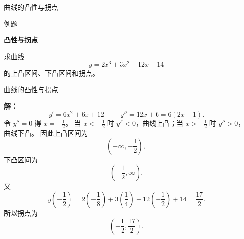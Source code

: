 \documentclass[aspectratio=169,10pt,fontset=fandol]{ctexbeamer}
\begin{document}
\begin{frame}[t,fragile]{曲线的凸性与拐点}
\footnotesize
\begin{block}{例题}
{\footnotesize
\textbf{凸性与拐点}\par

求曲线
\[
y=2x^3+3x^2+12x+14
\]
的上凸区间、下凸区间和拐点。

}
\end{block}
\end{frame}
\begin{frame}[t,fragile]{曲线的凸性与拐点}
\footnotesize
{\footnotesize
\textbf{解：}
\[
y'=6x^2+6x+12,\qquad y''=12x+6=6(2x+1).
\]
令 $y''=0$ 得 $x=-\frac12$。 当 $x<-\frac12$ 时 $y''<0$，曲线上凸；当 $x>-\frac12$ 时 $y''>0$，曲线下凸。 因此上凸区间为
\[
\left(-\infty,-\frac12\right),
\]
下凸区间为
\[
\left(-\frac12,\infty\right).
\]
又
\[
y\left(-\frac12\right)=2\left(-\frac18\right)+3\left(\frac14\right)+12\left(-\frac12\right)+14
=\frac{17}{2}.
\]
所以拐点为
\[
\left(-\frac12,\frac{17}{2}\right).
\]

}
\end{frame}
\end{document}
